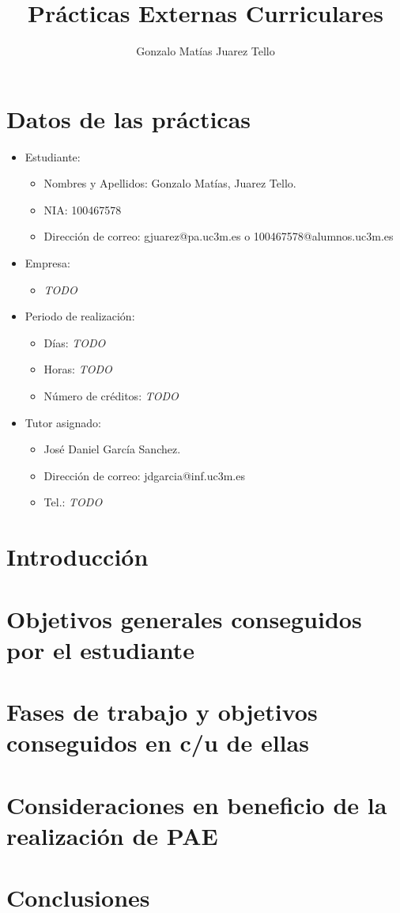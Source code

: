 \documentclass{report}
\title{Prácticas Externas Curriculares}
\author{Gonzalo Matías Juarez Tello}
\date{}
\begin{document}
\maketitle

\section*{Datos de las prácticas}

\begin{itemize}
\item Estudiante:
  \begin{itemize}
  \item Nombres y Apellidos: Gonzalo Matías, Juarez Tello.
  \item NIA: 100467578
  \item Dirección de correo: gjuarez@pa.uc3m.es o 100467578@alumnos.uc3m.es
  \end{itemize}

\item Empresa:
  \begin{itemize}
  \item \emph{TODO}
  \end{itemize}

\item Periodo de realización:
  \begin{itemize}
  \item Días: \emph{TODO}
  \item Horas: \emph{TODO}
  \item Número de créditos: \emph{TODO}
  \end{itemize}

\item Tutor asignado:
  \begin{itemize}
  \item José Daniel García Sanchez.
  \item Dirección de correo: jdgarcia@inf.uc3m.es
  \item Tel.: \emph{TODO}
  \end{itemize}
\end{itemize}

\section{Introducción}

\section{Objetivos generales conseguidos por el estudiante}

\section{Fases de trabajo y objetivos conseguidos en c/u de ellas}

\section{Consideraciones en beneficio de la realización de PAE}

\section{Conclusiones}
\end{document}

